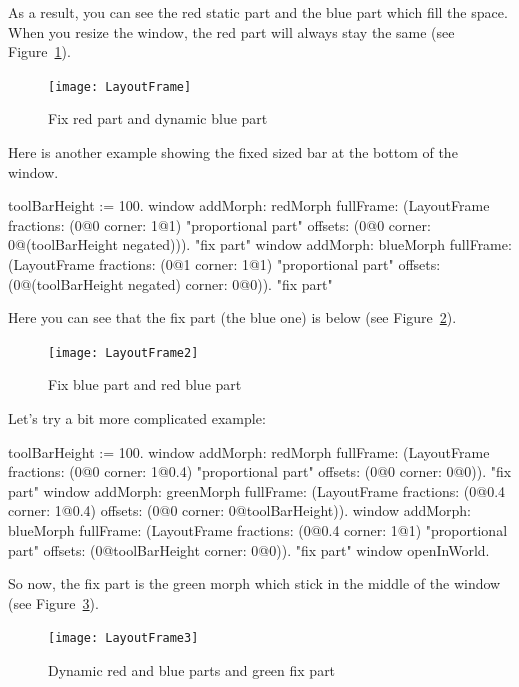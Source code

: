\documentclass[a4paper,10pt,twoside]{book}
\begin{document}
As a result, you can see the red static part and the blue part which fill the space. When you resize the window, the red part will always stay the same (see Figure~\ref{fig:layoutFrame}).

\begin{figure}[ht]\centering
	\texttt{[image: LayoutFrame]}
	\caption{Fix red part and dynamic blue part}
	\label{fig:layoutFrame}
\end{figure}

Here is another example showing the fixed sized bar at the bottom of the window.
\begin{code}{}
toolBarHeight := 100.
window
	addMorph: redMorph
	fullFrame: (LayoutFrame
				fractions: (0@0 corner: 1@1) "proportional part"
				offsets: (0@0 corner: 0@(toolBarHeight negated))). "fix part"
window
	addMorph: blueMorph
	fullFrame: (LayoutFrame
				fractions: (0@1 corner: 1@1) "proportional part"
				offsets: (0@(toolBarHeight negated) corner: 0@0)). "fix part"
\end{code}

Here you can see that the fix part (the blue one) is below (see Figure~\ref{fig:layoutFrame2}).

\begin{figure}[ht]\centering
	\texttt{[image: LayoutFrame2]}
	\caption{Fix blue part and red blue part}
	\label{fig:layoutFrame2}
\end{figure}

Let's try a bit more complicated example:
\begin{code}{}
toolBarHeight := 100.
window
	addMorph: redMorph
	fullFrame: (LayoutFrame
				fractions: (0@0 corner: 1@0.4) "proportional part"
				offsets: (0@0 corner: 0@0)). "fix part"
window
	addMorph: greenMorph
	fullFrame: (LayoutFrame
				fractions: (0@0.4 corner: 1@0.4)
				offsets: (0@0 corner: 0@toolBarHeight)).				
window
	addMorph: blueMorph
	fullFrame: (LayoutFrame
				fractions: (0@0.4 corner: 1@1) "proportional part"
				offsets: (0@toolBarHeight corner: 0@0)). "fix part"
window openInWorld.
\end{code}

So now, the fix part is the green morph which stick in the middle of the window (see Figure~\ref{fig:layoutFrame3}).

\begin{figure}[ht]\centering
	\texttt{[image: LayoutFrame3]}
	\caption{Dynamic red and blue parts and green fix part}
	\label{fig:layoutFrame3}
\end{figure}
\end{document}
